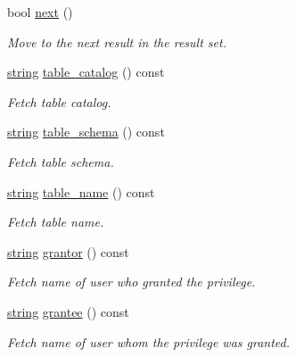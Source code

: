 \begin{DoxyCompactItemize}
\item 
bool \mbox{\hyperlink{classnanodbc_1_1catalog_1_1table__privileges_a4960cb6d0edfa988ad3dbdf2940e0c93}{next}} ()
\begin{DoxyCompactList}\small\item\em Move to the next result in the result set. \end{DoxyCompactList}\item 
\mbox{\hyperlink{namespacenanodbc_abfc0ece56278e590911ec8352774c212}{string}} \mbox{\hyperlink{classnanodbc_1_1catalog_1_1table__privileges_aa1212da091b4c95b680a4de4c4906927}{table\+\_\+catalog}} () const
\begin{DoxyCompactList}\small\item\em Fetch table catalog. \end{DoxyCompactList}\item 
\mbox{\hyperlink{namespacenanodbc_abfc0ece56278e590911ec8352774c212}{string}} \mbox{\hyperlink{classnanodbc_1_1catalog_1_1table__privileges_a75049bbc32d7a4e4c53a3723f3859da3}{table\+\_\+schema}} () const
\begin{DoxyCompactList}\small\item\em Fetch table schema. \end{DoxyCompactList}\item 
\mbox{\hyperlink{namespacenanodbc_abfc0ece56278e590911ec8352774c212}{string}} \mbox{\hyperlink{classnanodbc_1_1catalog_1_1table__privileges_aac883f1373e4e6d9965f93cdff781a79}{table\+\_\+name}} () const
\begin{DoxyCompactList}\small\item\em Fetch table name. \end{DoxyCompactList}\item 
\mbox{\hyperlink{namespacenanodbc_abfc0ece56278e590911ec8352774c212}{string}} \mbox{\hyperlink{classnanodbc_1_1catalog_1_1table__privileges_a2b49c7a12f7e7ce3ea2c4f7106635245}{grantor}} () const
\begin{DoxyCompactList}\small\item\em Fetch name of user who granted the privilege. \end{DoxyCompactList}\item 
\mbox{\hyperlink{namespacenanodbc_abfc0ece56278e590911ec8352774c212}{string}} \mbox{\hyperlink{classnanodbc_1_1catalog_1_1table__privileges_ab14ef42b52e2694e836d01105224d815}{grantee}} () const
\begin{DoxyCompactList}\small\item\em Fetch name of user whom the privilege was granted. \end{DoxyCompactList}\item 

\end{DoxyCompactItemize}
